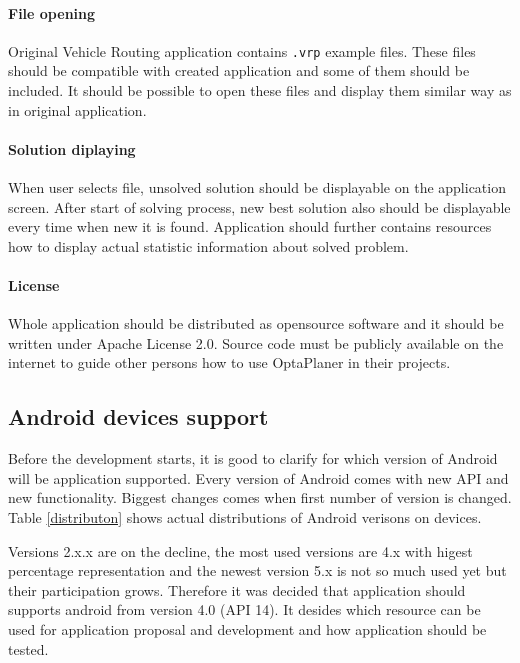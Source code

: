 \paragraph{File opening}
Original Vehicle Routing application contains \texttt{.vrp} example files. These files should be compatible with created
application and some of them should be included. It should be possible to open these files and display them similar way
as in original application.

\paragraph{Solution diplaying}
When user selects file, unsolved solution should be displayable on the application screen. After start of solving
process, new best solution also should be displayable every time when new it is found. Application should further
contains resources how to display actual statistic information about solved problem.

\paragraph{License}
Whole application should be distributed as opensource software and it should be written under Apache License 2.0.
Source code must be publicly available on the internet to guide other persons how to use OptaPlaner in their projects.

\subsection{Android devices support}
Before the development starts, it is good to clarify for which version of Android will be application supported. Every
version of Android comes with new API and new functionality. Biggest changes comes when first number of version is
changed. Table \ref{distributon} shows actual distributions of Android verisons on devices.

Versions 2.x.x are on the decline, the most used versions are 4.x with higest percentage representation and the newest
version 5.x is not so much used yet but their participation grows. Therefore it was decided that application should
supports android from version 4.0 (API 14). It desides which resource can be used for application proposal and
development and how application should be tested.

